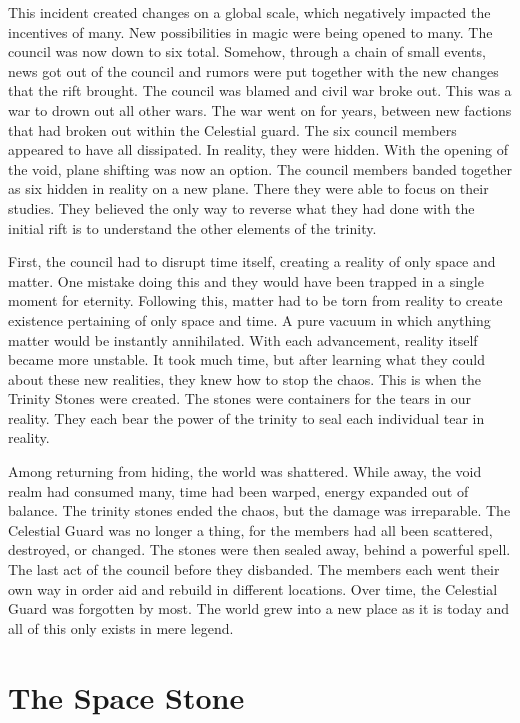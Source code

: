 This incident created changes on a global scale, which negatively impacted the incentives of many. New possibilities in magic were being opened to many. The council was now down to six total. Somehow, through a chain of small events, news got out of the council and rumors were put together with the new changes that the rift brought. The council was blamed and civil war broke out. This was a war to drown out all other wars. The war went on for years, between new factions that had broken out within the Celestial guard. The six council members appeared to have all dissipated. In reality, they were hidden. With the opening of the void, plane shifting was now an option. The council members banded together as six hidden in reality on a new plane. There they were able to focus on their studies. They believed the only way to reverse what they had done with the initial rift is to understand the other elements of the trinity. 

First, the council had to disrupt time itself, creating a reality of only space and matter. One mistake doing this and they would have been trapped in a single moment for eternity. Following this, matter had to be torn from reality to create existence pertaining of only space and time. A pure vacuum in which anything matter would be instantly annihilated. With each advancement, reality itself became more unstable. It took much time, but after learning what they could about these new realities, they knew how to stop the chaos. This is when the Trinity Stones were created. The stones were containers for the tears in our reality. They each bear the power of the trinity to seal each individual tear in reality.

Among returning from hiding, the world was shattered. While away, the void realm had consumed many, time had been warped, energy expanded out of balance. The trinity stones ended the chaos, but the damage was irreparable. The Celestial Guard was no longer a thing, for the members had all been scattered, destroyed, or changed. The stones were then sealed away, behind a powerful spell. The last act of the council before they disbanded. The members each went their own way in order aid and rebuild in different locations. Over time, the Celestial Guard was forgotten by most. The world grew into a new place as it is today and all of this only exists in mere legend.  

\section{The Space Stone}

